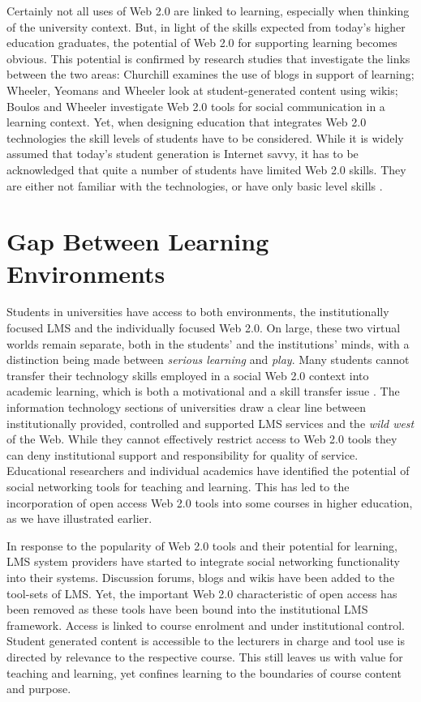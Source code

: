 Certainly not all uses of Web 2.0 are linked to learning, especially when
thinking of the university context. But, in light of the \LLLs skills expected
from today's higher education graduates, the potential of Web 2.0 for supporting
learning becomes obvious. This potential is confirmed by research studies that
investigate the links between the two areas: Churchill \citeyearpar{Churchill2009}
examines the use of blogs in support of learning; Wheeler, Yeomans and Wheeler
\citeyearpar{Wheeler2008} look at student-generated content using wikis; Boulos and
Wheeler \citeyearpar{Boulos2007} investigate Web 2.0 tools for social communication
in a learning context. Yet, when designing education that integrates Web 2.0
technologies the skill levels of students have to be considered. While it is
widely assumed that today's student generation is Internet savvy, it has to be
acknowledged that quite a number of students have limited Web 2.0 skills. They
are either not familiar with the technologies, or have only basic level skills
\citep{Kennedy2008}.

\section{Gap Between Learning Environments}
Students in universities have access to both environments, the institutionally
focused LMS and the individually focused Web 2.0. On large, these two virtual
worlds remain separate, both in the students' and the institutions' minds, with
a distinction being made between \textit{serious learning} and \textit{play}. 
Many students cannot transfer their technology skills employed in a social Web
2.0 context into academic learning, which is both a motivational and a skill
transfer issue \citep{Katz2005}. The information technology sections of
universities draw a clear line between institutionally provided, controlled and
supported LMS services and the \textit{wild west} of the Web. While they cannot
effectively restrict access to Web 2.0 tools they can deny institutional support
and responsibility for quality of service. Educational researchers and
individual academics have identified the potential of social networking tools
for teaching and learning. This has led to the incorporation of open access Web
2.0 tools into some courses in higher education, as we have illustrated earlier.

In response to the popularity of Web 2.0 tools and their potential for learning,
LMS system providers have started to integrate social networking functionality
into their systems. Discussion forums, blogs and wikis have been added to the
tool-sets of LMS. Yet, the important Web 2.0 characteristic of open access has
been removed as these tools have been bound into the institutional LMS
framework. Access is linked to course enrolment and under institutional control.
Student generated content is accessible to the lecturers in charge and tool use
is directed by relevance to the respective course. This still leaves us with
value for teaching and learning, yet confines learning to the boundaries of
course content and purpose.

